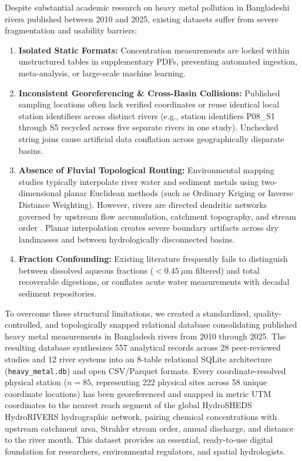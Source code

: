 \documentclass[11pt,a4paper]{article}
\begin{document}
Despite substantial academic research on heavy metal pollution in Bangladeshi rivers published between 2010 and 2025, existing datasets suffer from severe fragmentation and usability barriers:
\begin{enumerate}
    \item \textbf{Isolated Static Formats:} Concentration measurements are locked within unstructured tables in supplementary PDFs, preventing automated ingestion, meta-analysis, or large-scale machine learning.
    \item \textbf{Inconsistent Georeferencing \& Cross-Basin Collisions:} Published sampling locations often lack verified coordinates or reuse identical local station identifiers across distinct rivers (e.g., station identifiers P08\_S1 through S5 recycled across five separate rivers in one study). Unchecked string joins cause artificial data conflation across geographically disparate basins.
    \item \textbf{Absence of Fluvial Topological Routing:} Environmental mapping studies typically interpolate river water and sediment metals using two-dimensional planar Euclidean methods (such as Ordinary Kriging or Inverse Distance Weighting). However, rivers are directed dendritic networks governed by upstream flow accumulation, catchment topography, and stream order \citep{Lehner2013}. Planar interpolation creates severe boundary artifacts across dry landmasses and between hydrologically disconnected basins.
    \item \textbf{Fraction Confounding:} Existing literature frequently fails to distinguish between dissolved aqueous fractions ($<0.45\ \mu\text{m}$ filtered) and total recoverable digestions, or conflates acute water measurements with decadal sediment repositories.
\end{enumerate}

To overcome these structural limitations, we created a standardized, quality-controlled, and topologically snapped relational database consolidating published heavy metal measurements in Bangladesh rivers from 2010 through 2025. The resulting database synthesizes 557 analytical records across 28 peer-reviewed studies and 12 river systems into an 8-table relational SQLite architecture (\texttt{heavy\_metal.db}) and open CSV/Parquet formats. Every coordinate-resolved physical station ($n=85$, representing 222 physical sites across 58 unique coordinate locations) has been georeferenced and snapped in metric UTM coordinates to the nearest reach segment of the global HydroSHEDS HydroRIVERS hydrographic network, pairing chemical concentrations with upstream catchment area, Strahler stream order, annual discharge, and distance to the river mouth. This dataset provides an essential, ready-to-use digital foundation for researchers, environmental regulators, and spatial hydrologists.
\end{document}
